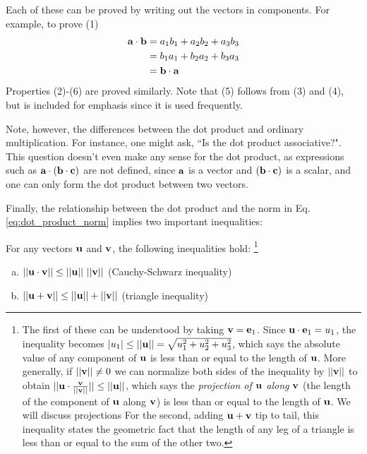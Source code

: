 \documentclass[12pt,letterpaper,reqno]{article}
\numberwithin{equation}{section}
\newcommand{\ti}[1]{\textit{#1}}
\begin{document}
\begin{pf}
Each of these can be proved by writing out the vectors in components. For example, to prove (1)
\begin{align*}
	{\bf a}\cdot {\bf b}&=a_1b_1+a_2b_2+a_3b_3 \\
	&=b_1a_1+b_2a_2+b_3a_3 \\
	&={\bf b}\cdot {\bf a}
\end{align*}
Properties (2)-(6) are proved similarly. Note that (5) follows from (3) and (4), but is included for emphasis since it is used frequently. 	
\end{pf}


Note, however, the differences between the dot product and ordinary multiplication. For instance, one might ask, ``Is the dot product associative?". This question doesn't even make any sense for the dot product, as expressions such as ${\bf a}\cdot ({\bf b}\cdot {\bf c})$ are not defined, since ${\bf a}$ is a vector and $({\bf b}\cdot {\bf c})$ is a scalar, and one can only form the dot product between two vectors. 


Finally, the relationship between the dot product and the norm in Eq. \eqref{eq:dot_product_norm} implies two important inequalities:

\begin{prop}
For any vectors ${\bf u}$ and ${\bf v}$, the following inequalities hold: \footnote{The first of these can be understood by taking ${\bf v}={\bf e}_1$. Since ${\bf u}\cdot {\bf e}_1=u_1$, the inequality becomes $|u_1| \leq ||{\bf u}||=\sqrt{u_1^2+u_2^2+u_3^2}$, which says the absolute value of any component of ${\bf u}$ is less than or equal to the length of ${\bf u}$. More generally, if $||{\bf v}|| \neq 0$ we can normalize both sides of the inequality by $||{\bf v}||$ to obtain $||{\bf u}\cdot \frac{{\bf v}}{||{\bf v}||}|| \leq ||{\bf u}||$, which says the \ti{projection of ${\bf u}$ along ${\bf v}$} (the length of the component of ${\bf u}$ along ${\bf v}$) is less than or equal to the length of ${\bf u}$. We will discuss projections   For the second, adding ${\bf u}+{\bf v}$ tip to tail, this inequality states the geometric fact that the length of any leg of a triangle is less than or equal to the sum of the other two.}
\begin{enumerate}[(a)]
	\item $||{\bf u}\cdot {\bf v}|| \leq ||{\bf u}|| \ ||{\bf v}||$ (Cauchy-Schwarz inequality)
		\item $||{\bf u}+{\bf v}||\leq ||{\bf u}|| + ||{\bf v}||$ (triangle inequality) 
\end{enumerate}
\end{prop}
\end{document}

